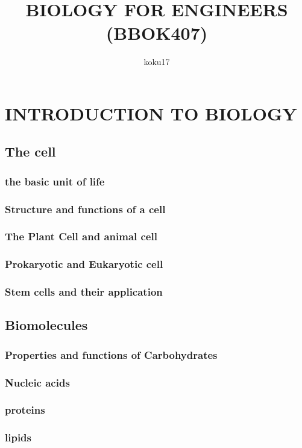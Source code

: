 \documentclass{article}
\author{koku17}
\title{BIOLOGY FOR ENGINEERS (BBOK407)}
\begin{document}
	\maketitle \thispagestyle{empty} \newpage
	\tableofcontents \thispagestyle{empty} \newpage \setcounter{page}{1}
	\section{INTRODUCTION TO BIOLOGY}
	\subsection{The cell}
	\subsubsection{the basic unit of life}
	\subsubsection{Structure and functions of a cell}
	\subsubsection{The Plant Cell and animal cell}
	\subsubsection{Prokaryotic and Eukaryotic cell}
	\subsubsection{Stem cells and their application}

	\subsection{Biomolecules}
	\subsubsection{Properties and functions of Carbohydrates}
	\subsubsection{Nucleic acids}
	\subsubsection{proteins}
	\subsubsection{lipids}
\end{document}
